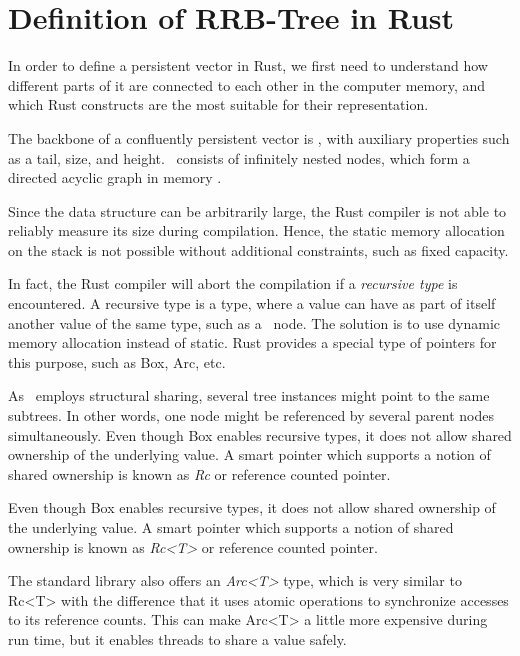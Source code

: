 \chapter{Definition of RRB-Tree in Rust}

In order to define a persistent vector in Rust, we first need to understand how different parts of it are connected to each other in the computer memory, and which Rust constructs are the most suitable for their representation. 

The backbone of a confluently persistent vector is \rrbtree, with auxiliary properties such as a tail, size, and height. \rrbtree\ consists of infinitely nested nodes, which form a directed acyclic graph in memory . 

Since the data structure can be arbitrarily large, the Rust compiler is not able to reliably measure its size during compilation. Hence, the static memory allocation on the stack is not possible without additional constraints, such as fixed capacity. 

In fact, the Rust compiler will abort the compilation if a \emph{recursive type} is encountered. A recursive type is a type, where a value can have as part of itself another value of the same type, such as a \rrbtree\ node. The solution is to use dynamic memory allocation instead of static. Rust provides a special type of pointers for this purpose, such as Box, Arc, etc. 

As \rrbtree\ employs structural sharing, several tree instances might point to the same subtrees. In other words, one node might be referenced by several parent nodes simultaneously. Even though Box enables recursive types, it does not allow shared ownership of the underlying value. A smart pointer which supports a notion of shared ownership is known as \emph{Rc} or reference counted pointer. 

Even though Box enables recursive types, it does not allow shared ownership of the underlying value. A smart pointer which supports a notion of shared ownership is known as \emph{Rc<T>} or reference counted pointer. 


The standard library also offers an \emph{Arc<T>} type, which is very similar to Rc<T> with the difference that it uses atomic operations to synchronize accesses to its reference counts. This can make Arc<T> a little more expensive during run time, but it enables threads to share a value safely. 

